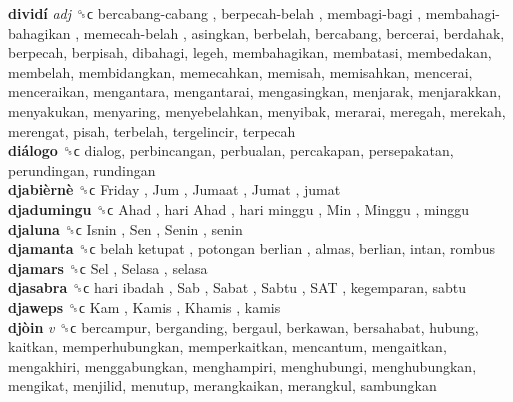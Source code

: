 \textbf{dividí} \emph{adj}  ␝ϲ   bercabang-cabang ,  berpecah-belah ,  membagi-bagi ,  membahagi-bahagikan ,  memecah-belah , asingkan, berbelah, bercabang, bercerai, berdahak, berpecah, berpisah, dibahagi, legeh, membahagikan, membatasi, membedakan, membelah, membidangkan, memecahkan, memisah, memisahkan, mencerai, menceraikan, mengantara, mengantarai, mengasingkan, menjarak, menjarakkan, menyakukan, menyaring, menyebelahkan, menyibak, merarai, meregah, merekah, merengat, pisah, terbelah, tergelincir, terpecah  \\
\textbf{diálogo} ␝ϲ  dialog, perbincangan, perbualan, percakapan, persepakatan, perundingan, rundingan  \\
\textbf{djabièrnè} ␝ϲ   Friday ,  Jum ,  Jumaat ,  Jumat , jumat  \\
\textbf{djadumingu} ␝ϲ   Ahad ,  hari Ahad ,  hari minggu ,  Min ,  Minggu , minggu  \\
\textbf{djaluna} ␝ϲ   Isnin ,  Sen ,  Senin , senin  \\
\textbf{djamanta} ␝ϲ   belah ketupat ,  potongan berlian , almas, berlian, intan, rombus  \\
\textbf{djamars} ␝ϲ   Sel ,  Selasa , selasa  \\
\textbf{djasabra} ␝ϲ   hari ibadah ,  Sab ,  Sabat ,  Sabtu ,  SAT , kegemparan, sabtu  \\
\textbf{djaweps} ␝ϲ   Kam ,  Kamis ,  Khamis , kamis  \\
\textbf{djòin} \emph{v}  ␝ϲ  bercampur, berganding, bergaul, berkawan, bersahabat, hubung, kaitkan, memperhubungkan, memperkaitkan, mencantum, mengaitkan, mengakhiri, menggabungkan, menghampiri, menghubungi, menghubungkan, mengikat, menjilid, menutup, merangkaikan, merangkul, sambungkan  \\
